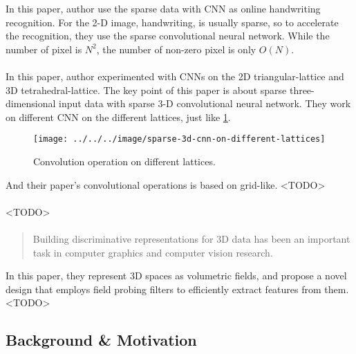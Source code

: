 \documentclass[border=0.5in]{blog}
\begin{document}
    In this paper, author use the sparse data with CNN as online handwriting recognition.
    For the 2-D image, handwriting, is usually sparse, so to accelerate the recognition,
    they use the sparse convolutional neural network. While the number of pixel is $N^2$,
    the number of non-zero pixel is only $O(N)$.
    
    \paragraph{\citep{DBLP:journals/corr/Graham15}}
    
    In this paper, author experimented with CNNs on the 2D triangular-lattice and 3D tetrahedral-lattice.
    The key point of this paper is about sparse three-dimensional input data
    with sparse 3-D convolutional neural network.
    They work on different CNN on the different lattices,
    just like \ref{fig:sparse-3d-cnn-on-different-lattices}.
    \begin{figure}
        \centering
        \texttt{[image: ../../../image/sparse-3d-cnn-on-different-lattices]}
        \caption{Convolution operation on different lattices.}
        \label{fig:sparse-3d-cnn-on-different-lattices}
    \end{figure}
    And their paper's convolutional operations is based on grid-like.
    <TODO>
    
    \paragraph{\citep{DBLP:journals/corr/KiefelJG15}}
    <TODO>
    
    \paragraph{\citep{DBLP:journals/corr/LiPSQG16}}
    \begin{quote}
        Building discriminative representations for 3D data has been an important task in computer graphics and computer vision research. 
    \end{quote}
    In this paper, they represent 3D spaces as volumetric fields,
    and propose a novel design that employs field probing filters to efficiently extract features from them.
    <TODO>
    
    \subsection{Background \& Motivation}
    \label{sec:rbm:bm}
    
\end{document}
